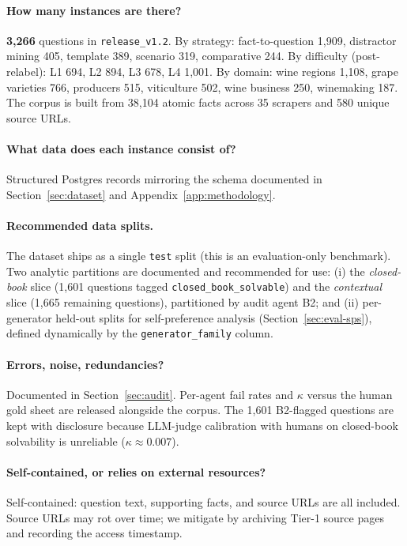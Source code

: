 \paragraph{How many instances are there?}
\textbf{3{,}266} questions in \texttt{release\_v1.2}. By strategy:
fact-to-question 1{,}909, distractor mining 405, template 389,
scenario 319, comparative 244. By difficulty (post-relabel):
L1 694, L2 894, L3 678, L4 1{,}001. By domain: wine regions 1{,}108,
grape varieties 766, producers 515, viticulture 502, wine business 250,
winemaking 187. The corpus is built from 38{,}104 atomic facts across
35 scrapers and 580 unique source URLs.

\paragraph{What data does each instance consist of?}
Structured Postgres records mirroring the schema documented in
Section~\ref{sec:dataset} and Appendix~\ref{app:methodology}.

\paragraph{Recommended data splits.}
The dataset ships as a single \texttt{test} split (this is an
evaluation-only benchmark). Two analytic partitions are documented and
recommended for use:
(i) the \emph{closed-book} slice (1{,}601 questions tagged
\texttt{closed\_book\_solvable}) and the \emph{contextual} slice
(1{,}665 remaining questions), partitioned by audit agent B2; and
(ii) per-generator held-out splits for self-preference analysis
(Section~\ref{sec:eval-sps}), defined dynamically by the
\texttt{generator\_family} column.

\paragraph{Errors, noise, redundancies?}
Documented in Section~\ref{sec:audit}. Per-agent fail rates and
$\kappa$ versus the human gold sheet are released alongside the
corpus. The 1{,}601 B2-flagged questions are kept with disclosure
because LLM-judge calibration with humans on closed-book solvability
is unreliable ($\kappa \approx 0.007$).

\paragraph{Self-contained, or relies on external resources?}
Self-contained: question text, supporting facts, and source URLs are
all included. Source URLs may rot over time; we mitigate by archiving
Tier-1 source pages and recording the access timestamp.

